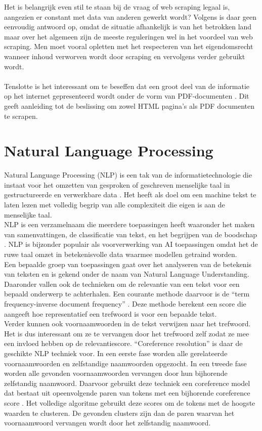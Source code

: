 Het is belangrijk even stil te staan bij de vraag of web scraping legaal is, aangezien er constant met data van anderen gewerkt wordt? Volgens \textcite{EPSI2015} is daar geen eenvoudig antwoord op, omdat de situatie afhankelijk is van het betrokken land maar over het algemeen zijn de meeste reguleringen wel in het voordeel van web scraping. Men moet vooral opletten met het respecteren van het eigendomsrecht wanneer inhoud verworven wordt door scraping en vervolgens verder gebruikt wordt.\\\\
Tenslotte is het interessant om te beseffen dat een groot deel van de informatie op het internet gepresenteerd wordt onder de vorm van PDF-documenten \autocite{Singrodia2019}. Dit geeft aanleiding tot de beslissing om zowel HTML pagina's als PDF documenten te scrapen.\\
\section{Natural Language Processing}
Natural Language Processing (NLP) is een tak van de informatietechnologie die instaat voor het omzetten van gesproken of geschreven menselijke taal in gestructureerde en verwerkbare data \autocite{Fanni2023}.
Het heeft als doel om een machine tekst te laten lezen met volledig begrip van alle complexiteit die eigen is aan de menselijke taal.\\
NLP is een verzamelnaam die meerdere toepassingen heeft waaronder het maken van samenvattingen, de classificatie van tekst, en het begrijpen van de boodschap \autocite{Khurana2022}. NLP is bijzonder populair als voorverwerking van AI toepassingen omdat het de ruwe taal omzet in betekenisvolle data waarmee modellen getraind worden.\\
Een bepaalde groep van toepassingen gaat over het analyseren van de betekenis van teksten en is gekend onder de naam van Natural Language Understanding. Daaronder vallen ook de technieken om de relevantie van een tekst voor een bepaald onderwerp te achterhalen. Een courante methode daarvoor is de ``term frequency-inverse document frequency'' \autocite{Havrlant2017}. Deze methode berekent een score die aangeeft hoe representatief een trefwoord is voor een bepaalde tekst.\\
Verder kunnen ook voornaamwoorden in de tekst verwijzen naar het trefwoord. Het is dus interessant om ze te vervangen door het trefwoord zelf zodat ze mee een invloed hebben op de relevantiescore. ``Coreference resolution'' is daar de geschikte NLP techniek voor. In een eerste fase worden alle gerelateerde voornaamwoorden en zelfstandige naamwoorden opgezocht. In een tweede fase worden alle gevonden voornaamwoorden vervangen door hun bijhorende zelfstandig naamwoord. Daarvoor gebruikt deze techniek een coreference model dat bestaat uit opeenvolgende paren van tokens met een bijhorende coreference score \autocite{Lee2017}. Het volledige algoritme \autocite{Explosion2025} gebruikt deze scores om de tokens met de hoogste waarden te clusteren. De gevonden clusters zijn dan de paren waarvan het voornaamwoord vervangen wordt door het zelfstandig naamwoord.
